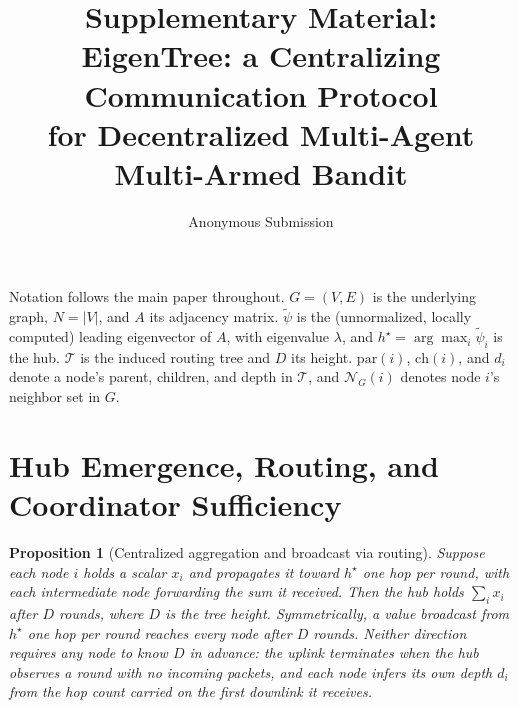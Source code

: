 \documentclass[letterpaper]{article} %
\title{Supplementary Material:\\EigenTree: a Centralizing Communication Protocol\\for Decentralized Multi-Agent Multi-Armed Bandit}
\author{
    Anonymous Submission
}
\newtheorem{proposition}{Proposition}
\begin{document}
\nocopyright

\maketitle

Notation follows the main paper throughout. $G=(V,E)$ is the underlying
graph, $N=|V|$, and $A$ its adjacency matrix. $\tilde\psi$ is the
(unnormalized, locally computed) leading eigenvector of $A$, with eigenvalue
$\lambda$, and $h^\star=\arg\max_i\tilde\psi_i$ is the hub. $\mathcal{T}$ is
the induced routing tree and $D$ its height. $\mathrm{par}(i)$, $\mathrm{ch}(i)$, and
$d_i$ denote a node's parent, children, and depth in $\mathcal{T}$, and
$\mathcal{N}_G(i)$ denotes node $i$'s neighbor set in $G$.

\section{Hub Emergence, Routing, and Coordinator Sufficiency}

\begin{proposition}[Centralized aggregation and broadcast via routing]
\label{prop:aggbcast}
Suppose each node $i$ holds a scalar $x_i$ and propagates it toward
$h^\star$ one hop per round, with each intermediate node forwarding the sum
it received. Then the hub holds $\sum_i x_i$ after $D$ rounds, where $D$ is
the tree height. Symmetrically, a value broadcast from $h^\star$ one hop
per round reaches every node after $D$ rounds. Neither direction requires
any node to know $D$ in advance: the uplink terminates when the hub
observes a round with no incoming packets, and each node infers its own
depth $d_i$ from the hop count carried on the first downlink it receives.
\end{proposition}
\end{document}
